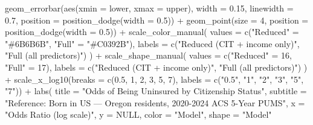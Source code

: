 \documentclass[
  letterpaper,
  DIV=11,
  numbers=noendperiod]{scrartcl}
\newenvironment{Shaded}{\begin{snugshade}}{\end{snugshade}}
\newcommand{\AttributeTok}[1]{\textcolor[rgb]{0.40,0.45,0.13}{#1}}
\newcommand{\ConstantTok}[1]{\textcolor[rgb]{0.56,0.35,0.01}{#1}}
\newcommand{\DecValTok}[1]{\textcolor[rgb]{0.68,0.00,0.00}{#1}}
\newcommand{\FloatTok}[1]{\textcolor[rgb]{0.68,0.00,0.00}{#1}}
\newcommand{\FunctionTok}[1]{\textcolor[rgb]{0.28,0.35,0.67}{#1}}
\newcommand{\NormalTok}[1]{\textcolor[rgb]{0.00,0.23,0.31}{#1}}
\newcommand{\OtherTok}[1]{\textcolor[rgb]{0.00,0.23,0.31}{#1}}
\newcommand{\SpecialCharTok}[1]{\textcolor[rgb]{0.37,0.37,0.37}{#1}}
\newcommand{\StringTok}[1]{\textcolor[rgb]{0.13,0.47,0.30}{#1}}
\begin{document}
\begin{Shaded}
\begin{Highlighting}[]
  \FunctionTok{geom\_errorbar}\NormalTok{(}\FunctionTok{aes}\NormalTok{(}\AttributeTok{xmin =}\NormalTok{ lower, }\AttributeTok{xmax =}\NormalTok{ upper),}
                \AttributeTok{width =} \FloatTok{0.15}\NormalTok{, }\AttributeTok{linewidth =} \FloatTok{0.7}\NormalTok{,}
                \AttributeTok{position =} \FunctionTok{position\_dodge}\NormalTok{(}\AttributeTok{width =} \FloatTok{0.5}\NormalTok{)) }\SpecialCharTok{+}
  \FunctionTok{geom\_point}\NormalTok{(}\AttributeTok{size =} \DecValTok{4}\NormalTok{,}
             \AttributeTok{position =} \FunctionTok{position\_dodge}\NormalTok{(}\AttributeTok{width =} \FloatTok{0.5}\NormalTok{)) }\SpecialCharTok{+}
  \FunctionTok{scale\_color\_manual}\NormalTok{(}
    \AttributeTok{values =} \FunctionTok{c}\NormalTok{(}\StringTok{"Reduced"} \OtherTok{=} \StringTok{"\#6B6B6B"}\NormalTok{, }\StringTok{"Full"} \OtherTok{=} \StringTok{"\#C0392B"}\NormalTok{),}
    \AttributeTok{labels =} \FunctionTok{c}\NormalTok{(}\StringTok{"Reduced (CIT + income only)"}\NormalTok{,}
               \StringTok{"Full (all predictors)"}\NormalTok{)}
\NormalTok{  ) }\SpecialCharTok{+}
  \FunctionTok{scale\_shape\_manual}\NormalTok{(}
    \AttributeTok{values =} \FunctionTok{c}\NormalTok{(}\StringTok{"Reduced"} \OtherTok{=} \DecValTok{16}\NormalTok{, }\StringTok{"Full"} \OtherTok{=} \DecValTok{17}\NormalTok{),}
    \AttributeTok{labels =} \FunctionTok{c}\NormalTok{(}\StringTok{"Reduced (CIT + income only)"}\NormalTok{,}
               \StringTok{"Full (all predictors)"}\NormalTok{)}
\NormalTok{  ) }\SpecialCharTok{+}
  \FunctionTok{scale\_x\_log10}\NormalTok{(}\AttributeTok{breaks =} \FunctionTok{c}\NormalTok{(}\FloatTok{0.5}\NormalTok{, }\DecValTok{1}\NormalTok{, }\DecValTok{2}\NormalTok{, }\DecValTok{3}\NormalTok{, }\DecValTok{5}\NormalTok{, }\DecValTok{7}\NormalTok{),}
                \AttributeTok{labels =} \FunctionTok{c}\NormalTok{(}\StringTok{"0.5"}\NormalTok{, }\StringTok{"1"}\NormalTok{, }\StringTok{"2"}\NormalTok{, }\StringTok{"3"}\NormalTok{, }\StringTok{"5"}\NormalTok{, }\StringTok{"7"}\NormalTok{)) }\SpecialCharTok{+}
  \FunctionTok{labs}\NormalTok{(}
    \AttributeTok{title    =} \StringTok{"Odds of Being Uninsured by Citizenship Status"}\NormalTok{,}
    \AttributeTok{subtitle =} \StringTok{"Reference: Born in US — Oregon residents, 2020{-}2024 ACS 5{-}Year PUMS"}\NormalTok{,}
    \AttributeTok{x        =} \StringTok{"Odds Ratio (log scale)"}\NormalTok{,}
    \AttributeTok{y        =} \ConstantTok{NULL}\NormalTok{,}
    \AttributeTok{color    =} \StringTok{"Model"}\NormalTok{,}
    \AttributeTok{shape    =} \StringTok{"Model"}

\end{Highlighting}
\end{Shaded}
\end{document}
